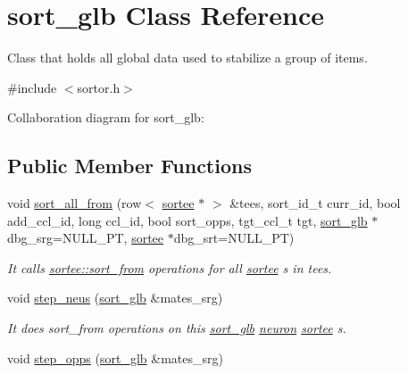 \hypertarget{classsort__glb}{}\section{sort\+\_\+glb Class Reference}
\label{classsort__glb}


Class that holds all global data used to stabilize a group of items.  




{\ttfamily \#include $<$sortor.\+h$>$}



Collaboration diagram for sort\+\_\+glb\+:
\subsection*{Public Member Functions}
\begin{DoxyCompactItemize}
\item 
void \hyperlink{classsort__glb_ac755a6417f43e7860ca96317a8e8f4e8}{sort\+\_\+all\+\_\+from} (row$<$ \hyperlink{classsortee}{sortee} $\ast$ $>$ \&tees, sort\+\_\+id\+\_\+t curr\+\_\+id, bool add\+\_\+ccl\+\_\+id, long ccl\+\_\+id, bool sort\+\_\+opps, tgt\+\_\+ccl\+\_\+t tgt, \hyperlink{classsort__glb}{sort\+\_\+glb} $\ast$dbg\+\_\+srg=N\+U\+L\+L\+\_\+\+PT, \hyperlink{classsortee}{sortee} $\ast$dbg\+\_\+srt=N\+U\+L\+L\+\_\+\+PT)
\begin{DoxyCompactList}\small\item\em It calls \hyperlink{classsortee_a5cc113e22e62dfcb3869c2786ae5345e}{sortee\+::sort\+\_\+from} operations for all \hyperlink{classsortee}{sortee} s in tees. \end{DoxyCompactList}\item 
void \hyperlink{classsort__glb_a25baf3b8e0bc9bdca9c0d6658b298f07}{step\+\_\+neus} (\hyperlink{classsort__glb}{sort\+\_\+glb} \&mates\+\_\+srg)\hypertarget{classsort__glb_a25baf3b8e0bc9bdca9c0d6658b298f07}{}\label{classsort__glb_a25baf3b8e0bc9bdca9c0d6658b298f07}

\begin{DoxyCompactList}\small\item\em It does sort\+\_\+from operations on this \hyperlink{classsort__glb}{sort\+\_\+glb} \hyperlink{classneuron}{neuron} \hyperlink{classsortee}{sortee} s. \end{DoxyCompactList}\item 
void \hyperlink{classsort__glb_a40a9304f2ef43071021472a8e020069a}{step\+\_\+opps} (\hyperlink{classsort__glb}{sort\+\_\+glb} \&mates\+\_\+srg)\hypertarget{classsort__glb_a40a9304f2ef43071021472a8e020069a}{}\label{classsort__glb_a40a9304f2ef43071021472a8e020069a}


\end{DoxyCompactItemize}
